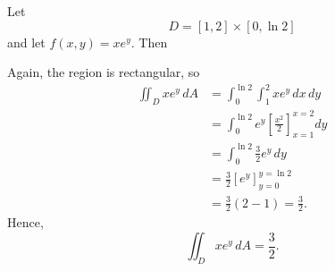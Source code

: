   \begin{example}
    \label{ex:double-integral-over-a-rectangle-hard}
    Let 
    \begin{equation}
      D = [1,2] \times [0,\ln 2]
    \end{equation}
    and let $f(x,y) = x e^y$. Then 
    \begin{center}
    \end{center}
    Again, the region is rectangular, so
    \begin{align*}
      \iint_D x e^y\,dA
      &= \int_0^{\ln 2} \int_1^2 x e^y\,dx\,dy \\
      &= \int_0^{\ln 2} e^y \left[ \frac{x^2}{2} \right]_{x=1}^{x=2} dy \\
      &= \int_0^{\ln 2} \frac{3}{2} e^y\,dy \\
      &= \frac{3}{2} \left[ e^y \right]_{y=0}^{y=\ln 2} \\
      &= \frac{3}{2}(2-1) = \frac{3}{2}.
    \end{align*}
    Hence,
    \begin{equation}
      \iint_D x e^y\,dA = \frac{3}{2}.
    \end{equation}
  \end{example}

